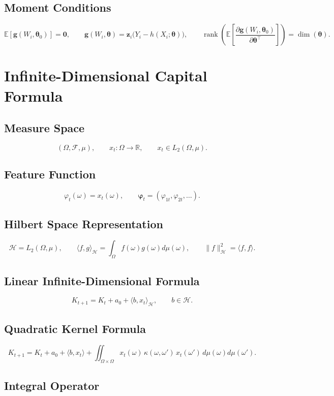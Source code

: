 \documentclass[11pt]{article}
\begin{document}
\subsection{Moment Conditions}
\[
\mathbb{E}[\bm{g}(W_i,\bm{\theta}_0)]=\bm{0},
\qquad \bm{g}(W_i,\bm{\theta})=\bm{z}_i\big(Y_i-h(X_i;\bm{\theta})\big),
\qquad \operatorname{rank}\!\left(\mathbb{E}\!\left[\frac{\partial \bm{g}(W_i,\bm{\theta}_0)}{\partial \bm{\theta}^\top}\right]\right)=\dim(\bm{\theta}).
\]

\section{Infinite-Dimensional Capital Formula}

\subsection{Measure Space}
\[
(\Omega,\mathcal{F},\mu),
\qquad x_t:\Omega\to\mathbb{R},
\qquad x_t\in L_2(\Omega,\mu).
\]

\subsection{Feature Function}
\[
\varphi_t(\omega)=x_t(\omega),
\qquad \bm{\varphi}_t=(\varphi_{1t},\varphi_{2t},\ldots).
\]

\subsection{Hilbert Space Representation}
\[
\mathcal{H}=L_2(\Omega,\mu),
\qquad \langle f,g\rangle_{\mathcal{H}}=\int_\Omega f(\omega)g(\omega)d\mu(\omega),
\qquad \|f\|_{\mathcal{H}}^2=\langle f,f\rangle.
\]

\subsection{Linear Infinite-Dimensional Formula}
\[
K_{t+1}=K_t+a_0+\langle b, x_t\rangle_{\mathcal{H}},
\qquad b\in\mathcal{H}.
\]

\subsection{Quadratic Kernel Formula}
\[
K_{t+1}=K_t+a_0+\langle b,x_t\rangle+\iint_{\Omega\times\Omega}x_t(\omega)\,\kappa(\omega,\omega')\,x_t(\omega')\,d\mu(\omega)d\mu(\omega').
\]

\subsection{Integral Operator}
\end{document}
